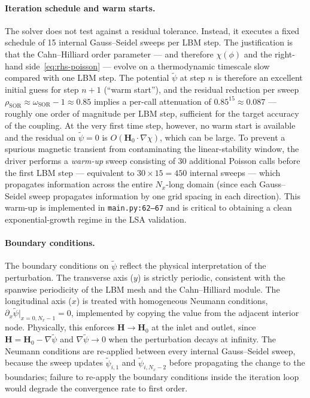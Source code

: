 \paragraph{Iteration schedule and warm starts.}
The solver does not test against a residual tolerance.
Instead, it executes a fixed schedule of 15 internal Gauss--Seidel sweeps per LBM step.
The justification is that the Cahn--Hilliard order parameter --- and therefore $\chi(\phi)$ and the right-hand side~\eqref{eq:rhs-poisson} --- evolve on a thermodynamic timescale slow compared with one LBM step.
The potential $\tilde{\psi}$ at step $n$ is therefore an excellent initial guess for step $n+1$ (``warm start''), and the residual reduction per sweep $\rho_{\mathrm{SOR}} \approx \omega_{\mathrm{SOR}} - 1 \approx 0.85$ implies a per-call attenuation of $0.85^{15} \approx 0.087$ --- roughly one order of magnitude per LBM step, sufficient for the target accuracy of the coupling.
At the very first time step, however, no warm start is available and the residual on $\tilde{\psi}=0$ is $O(\bm{H}_0\!\cdot\!\nabla\chi)$, which can be large.
To prevent a spurious magnetic transient from contaminating the linear-stability window, the driver performs a \emph{warm-up} sweep consisting of 30 additional Poisson calls before the first LBM step --- equivalent to $30\times 15 = 450$ internal sweeps --- which propagates information across the entire $N_x$-long domain (since each Gauss--Seidel sweep propagates information by one grid spacing in each direction).
This warm-up is implemented in \texttt{main.py:62--67} and is critical to obtaining a clean exponential-growth regime in the LSA validation.

\paragraph{Boundary conditions.}
The boundary conditions on $\tilde{\psi}$ reflect the physical interpretation of the perturbation.
The transverse axis ($y$) is strictly periodic, consistent with the spanwise periodicity of the LBM mesh and the Cahn--Hilliard module.
The longitudinal axis ($x$) is treated with homogeneous Neumann conditions, $\partial_x\tilde{\psi}|_{x=0, N_x-1} = 0$, implemented by copying the value from the adjacent interior node.
Physically, this enforces $\bm{H}\to\bm{H}_0$ at the inlet and outlet, since $\bm{H} = \bm{H}_0 - \nabla\tilde{\psi}$ and $\nabla\tilde{\psi}\to 0$ when the perturbation decays at infinity.
The Neumann conditions are re-applied between every internal Gauss--Seidel sweep, because the sweep updates $\tilde{\psi}_{i,1}$ and $\tilde{\psi}_{i,N_x-2}$ before propagating the change to the boundaries;
failure to re-apply the boundary conditions inside the iteration loop would degrade the convergence rate to first order.

